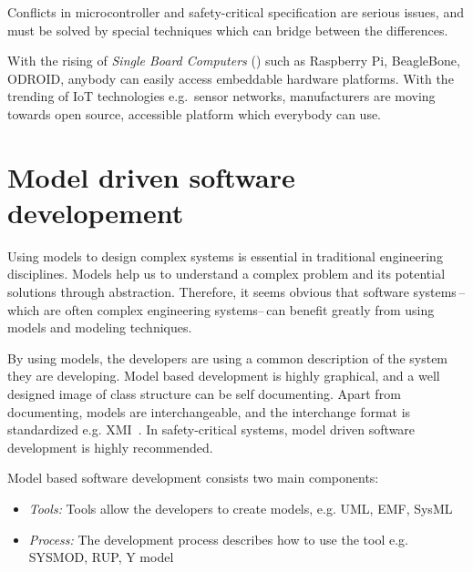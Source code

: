 Conflicts in microcontroller and safety-critical specification are serious issues, and must be solved by special techniques which can bridge between the differences.

With the rising of \emph{Single Board Computers} () such as Raspberry Pi, BeagleBone, ODROID, anybody can easily access embeddable hardware platforms. With the trending of IoT technologies e.g.\ sensor networks, manufacturers are moving towards open source, accessible platform which everybody can use.

\section{Model driven software developement}

Using models to design complex systems is essential in traditional engineering disciplines. Models help us to understand a complex problem and its potential solutions through abstraction. Therefore, it seems obvious that software systems\,--which are often complex engineering systems--\,can benefit greatly from using models and modeling techniques. \citep{pastor2008model}

By using models, the developers are using a common description of the system they are developing. Model based development is highly graphical, and a well designed image of class structure can be self documenting. Apart from documenting, models are interchangeable, and the interchange format is standardized e.g. XMI~\cite{XMI}. In safety-critical systems, model driven software development is highly recommended.

Model based software development consists two main components:
\begin{itemize}
	\item \emph{Tools:} Tools allow the developers to create models, e.g. UML, EMF, SysML
	\item \emph{Process:} The development process describes how to use the tool e.g. SYSMOD, RUP, Y model
\end{itemize}

